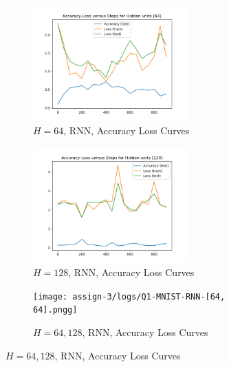 \begin{figure}[!htbp]
\begin{subfigure}
\centering
\includegraphics[angle=0,width=0.65\textwidth]{assign-3/logs/Q1-MNIST-RNN-[64].png}
\caption{$H=64$, RNN, Accuracy Loss Curves}
\end{subfigure}
\begin{subfigure}
\centering
\includegraphics[angle=0,width=0.65\textwidth]{assign-3/logs/Q1-MNIST-RNN-[128].png}
\caption{$H=128$, RNN, Accuracy Loss Curves}
\end{subfigure}
\begin{subfigure}
\centering
\texttt{[image: assign-3/logs/Q1-MNIST-RNN-[64, 64].pngg]}
\caption{$H=64, 128$, RNN, Accuracy Loss Curves}
\end{subfigure}
\end{figure}
